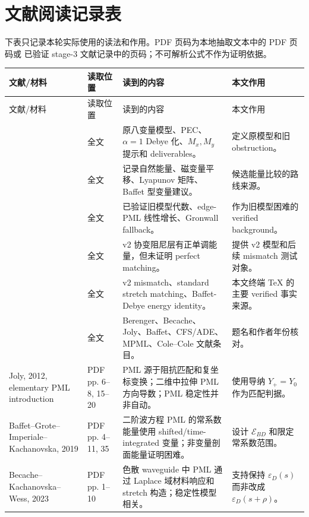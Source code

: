 \documentclass[UTF8,a4paper,11pt]{ctexart}
\newcommand{\Ecal}{\mathcal E}
\begin{document}
\section{文献阅读记录表}

下表只记录本轮实际使用的读法和作用。PDF 页码为本地抽取文本中的 PDF 页码或
已验证 stage-3 文献记录中的页码；不可解析公式不作为证明依据。

{\footnotesize
\begin{longtable}{L{0.20\textwidth}L{0.14\textwidth}L{0.29\textwidth}L{0.22\textwidth}}
\toprule
文献/材料 & 读取位置 & 读到的内容 & 本文作用 \\
\midrule
\endfirsthead
\toprule
文献/材料 & 读取位置 & 读到的内容 & 本文作用 \\
\midrule
\endhead
{}
& 全文
& 原八变量模型、PEC、\(\alpha=1\) Debye 化、\(M_x,M_y\) 提示和 deliverables。
& 定义原模型和旧 obstruction。 \\
& 全文
& 记录自然能量、磁变量平移、Lyapunov 矩阵、Baffet 型变量建议。
& 候选能量比较的路线来源。 \\
& 全文
& 已验证旧模型代数、edge-PML 线性增长、Gronwall fallback。
& 作为旧模型困难的 verified background。 \\
& 全文
& v2 协变阻尼层有正单调能量，但未证明 perfect matching。
& 提供 v2 模型和后续 mismatch 测试对象。 \\
& 全文
& v2 mismatch、standard stretch matching、Baffet-Debye energy identity。
& 本文终端 TeX 的主要 verified 事实来源。 \\
& 全文
& Berenger、Becache、Joly、Baffet、CFS/ADE、MPML、Cole--Cole 文献条目。
& 题名和作者年份核对。 \\
Joly, 2012, elementary PML introduction
& PDF pp. 6--8, 15--20
& PML 源于阻抗匹配和复坐标变换；二维中拉伸 PML 方向导数；PML 稳定性并非自动。
& 使用导纳 \(Y_+=Y_0\) 作为匹配判据。 \\
Baffet--Grote--Imperiale--Kachanovska, 2019
& PDF pp. 4--11, 35
& 二阶波方程 PML 的常系数能量使用 shifted/time-integrated 变量；非变量剖面能量证明困难。
& 设计 \(\Ecal_{BD}\) 和限定常系数范围。 \\
Becache--Kachanovska--Wess, 2023
& PDF pp. 1--10
& 色散 waveguide 中 PML 通过 Laplace 域材料响应和 stretch 构造；稳定性模型相关。
& 支持保持 \(\varepsilon_D(s)\) 而非改成 \(\varepsilon_D(s+\rho)\)。 \\

\end{longtable}}
\end{document}
